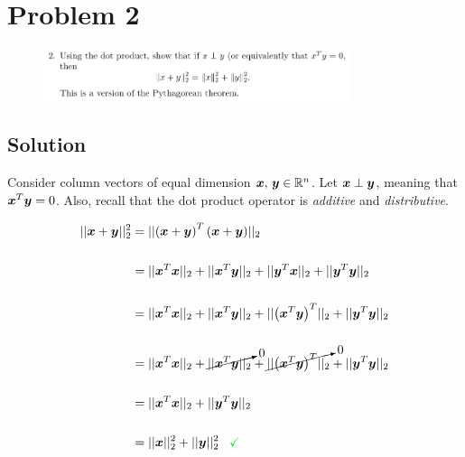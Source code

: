 
\begingroup
\allowdisplaybreaks

\newpage
\section*{Problem 2}

\begin{figure}[h]
	\centering
	\includegraphics[width=0.8\textwidth]{./images/prob2_statement.png}
\end{figure}

\subsection*{Solution}

Consider column vectors of equal dimension $\boldsymbol{x},\,\boldsymbol{y} \in \mathbb{R}^{n}$. Let $\boldsymbol{x} \perp \boldsymbol{y}$, meaning that $\boldsymbol{x}^T \boldsymbol{y} = 0$. Also, recall that the dot product operator is \textit{additive} and \textit{distributive}.

\begin{align*}
	|| {\boldsymbol{x} + \boldsymbol{y}} ||_2^2 &= || {\left(\boldsymbol{x} + \boldsymbol{y}\right)^T \left(\boldsymbol{x} + \boldsymbol{y}\right)} ||_2 \\
	\\
	&= || {\boldsymbol{x}^T\boldsymbol{x}} ||_2 + || {\boldsymbol{x}^T\boldsymbol{y}} ||_2 + || {\boldsymbol{y}^T\boldsymbol{x}} ||_2 + || {\boldsymbol{y}^T\boldsymbol{y}} ||_2 \\
	\\
	&= || {\boldsymbol{x}^T\boldsymbol{x}} ||_2 + || {\boldsymbol{x}^T\boldsymbol{y}} ||_2 + || {\left(\boldsymbol{x}^T\boldsymbol{y}\right)^T} ||_2 +|| {\boldsymbol{y}^T\boldsymbol{y}} ||_2 \\
	\\
	&= || {\boldsymbol{x}^T\boldsymbol{x}} ||_2 + \cancelto{0}{|| {\boldsymbol{x}^T\boldsymbol{y}} ||_2} + \cancelto{0}{|| {\left(\boldsymbol{x}^T\boldsymbol{y}\right)^T} ||_2} + || {\boldsymbol{y}^T\boldsymbol{y}} ||_2 \\
	\\
	&= || {\boldsymbol{x}^T\boldsymbol{x}} ||_2 + || {\boldsymbol{y}^T\boldsymbol{y}} ||_2 \\
	\\
	&= || {\boldsymbol{x}} ||_2^2 + || {\boldsymbol{y}} ||_2^2 \,\,\,\,\, \textcolor{green}{\checkmark}
\end{align*}



